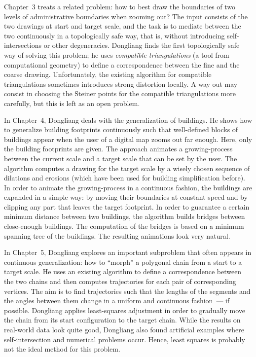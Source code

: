 {Chapter~3 treats a related problem: how to best draw the boundaries
of two levels of administrative boundaries when zooming out?  The
input consists of the two drawings at start and target scale, and
the task is to mediate between the two continuously in a
topologically safe way, that is, without introducing
self-intersections or other degeneracies.  Dongliang finds the first
topologically safe way of solving this problem; he uses
\emph{compatible triangulations} (a tool from computational
geometry) to define a correspondence between the fine and the coarse
drawing.  Unfortunately, the existing algorithm for compatible
triangulations sometimes introduces strong distortion locally.  A
way out may consist in choosing the Steiner points for the
compatible triangulations more carefully, but this is left as an
open problem.

In Chapter~4, Dongliang deals with the generalization of buildings.
He shows how to generalize building footprints continuously such
that well-defined blocks of buildings appear when the user of a
digital map zooms out far enough.  Here, only the building
footprints are given.  The approach animates a growing-process
between the current scale and a target scale that can be set by the
user.  The algorithm computes a drawing for the target scale by a
wisely chosen sequence of dilations and erosions (which have been
used for building simplification before).  In order to animate the
growing-process in a continuous fashion, the buildings are expanded
in a simple way: by moving their boundaries at constant speed and by
clipping any part that leaves the target footprint.  In order to
guarantee a certain minimum distance between two buildings, the
algorithm builds bridges between close-enough buildings.  The
computation of the bridges is based on a minimum spanning tree of
the buildings.  The resulting animations look very natural.

In Chapter~5, Dongliang explores an important subproblem that often
appears in continuous generalization: how to ``morph'' a polygonal
chain from a start to a target scale.  He uses an existing algorithm
to define a correspondence between the two chains and then computes
trajectories for each pair of corresponding vertices.  The aim is to
find trajectories such that the lengths of the segments and the
angles between them change in a uniform and continuous fashion~--- if
possible.  Dongliang applies least-squares adjustment in order to
gradually move the chain from its start configuration to the target
chain.  While the results on real-world data look quite good,
Dongliang also found artificial examples where self-intersection and
numerical problems occur.  Hence, least squares is probably not the
ideal method for this problem.

}
